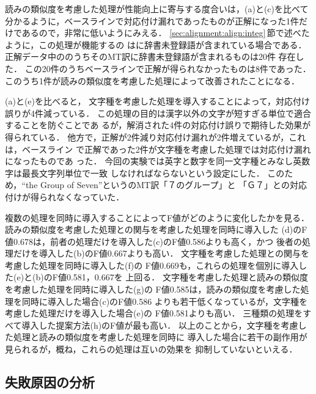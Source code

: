 読みの類似度を考慮した処理が性能向上に寄与する度合いは，(a)と(c)を比べて
分かるように，ベースラインで対応付け漏れであったものが正解になった1件だ
けであるので，非常に低いようにみえる．
\ref{sec:alignment:align:integ}\,節で述べたように，この処理が機能するの
は{\MTNP}に辞書未登録語が含まれている場合である．
正解データ中の{\CPNP}のうちそのMT訳に辞書未登録語が含まれるものは20件
存在した．
この20件のうちベースラインで正解が得られなかったものは8件であった．
このうち1件が読みの類似度を考慮した処理によって改善されたことになる．

(a)と(e)を比べると，
文字種を考慮した処理を導入することによって，対応付け誤りが4件減っている．
この処理の目的は漢字以外の文字が短すぎる単位で適合することを防ぐことであ
るが，解消された4件の対応付け誤りで期待した効果が得られている．
他方で，正解が2件減り対応付け漏れが2件増えているが，これは，ベースライン
で正解であった2件が文字種を考慮した処理では対応付け漏れになったものであ
った．
今回の実験では英字と数字を同一文字種とみなし英数字は最長文字列単位で一致
しなければならないという設定にした．
このため，``the Group of Seven''という{\CPNP}のMT訳「７のグループ」と
{\JNP}「Ｇ７」との対応付けが得られなくなっていた．

複数の処理を同時に導入することによってF値がどのように変化したかを見る．
読みの類似度を考慮した処理と{\N}の関与を考慮した処理を同時に導入した
(d)のF値0.678は，前者の処理だけを導入した(c)のF値0.586よりも高く，かつ
後者の処理だけを導入した(b)のF値0.667よりも高い．
文字種を考慮した処理と{\N}の関与を考慮した処理を同時に導入した(f)の
F値0.669も，これらの処理を個別に導入した(e)と(b)のF値0.581，0.667を 
上回る．
文字種を考慮した処理と読みの類似度を考慮した処理を同時に導入した(g)の
F値0.585は，読みの類似度を考慮した処理を同時に導入した場合(c)のF値0.586
よりも若干低くなっているが，文字種を考慮した処理だけを導入した場合(e)の
F値0.581よりも高い．
三種類の処理をすべて導入した提案方法(h)のF値が最も高い．
以上のことから，文字種を考慮した処理と読みの類似度を考慮した処理を同時に
導入した場合に若干の副作用が見られるが，概ね，これらの処理は互いの効果を
抑制していないといえる．


\subsection{失敗原因の分析}
\label{sec:experiment:error}

